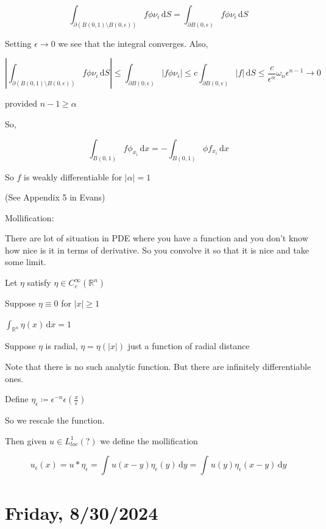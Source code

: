 \documentclass{article}
\theoremstyle{definition}
\begin{document}
\[
    \int_{\partial (B(0,1)\setminus B(0,\epsilon ))}^{} f \phi \nu _i \,\mathrm{d}S = \int_{\partial B(0,\epsilon)}^{} f \phi \nu_i \,\mathrm{d}S
\]

Setting \(\epsilon \to 0\) we see that the integral converges. Also,

\[
    \left\vert \int_{\partial (B(0,1)\setminus B(0,\epsilon))}^{} f \phi \nu_i \,\mathrm{d}S  \right\vert \leq \int_{\partial B(0,\epsilon)}^{} \vert f \phi \nu_i \vert \leq c \int_{\partial B(0,\epsilon)}^{} \vert f \vert  \,\mathrm{d}S \leq \frac{c}{\epsilon^\alpha} \omega_n \epsilon^{n-1} \to 0
\]

provided \(n - 1 \geq \alpha\) 

So,

\[
    \int_{B(0,1)}^{} f \phi_{x_i} \,\mathrm{d}x = - \int_{B(0,1)}^{} \phi f_{x_i} \,\mathrm{d}x 
\]

So \(f\) is weakly differentiable for \(\vert \alpha  \vert = 1\) 

(See Appendix 5 in Evans)

Mollification:

There are lot of situation in PDE where you have a function and you don't know how nice is it in terms of derivative. So you convolve it so that it is nice and take some limit.

Let \(\eta\) satisfy \(\eta \in C_c^{\infty} (\mathbb{R}^n)\)

Suppose \(\eta \equiv 0\) for \(\vert x \vert \geq 1\) 

\(\int_{\mathbb{R} ^n}^{} \eta (x) \,\mathrm{d}x = 1\) 

Suppose \(\eta \) is radial, \(\eta = \eta (\vert x \vert)\) just a function of radial distance

Note that there is no such analytic function. But there are infinitely differentiable ones.

Define \(\eta_{\epsilon} \coloneqq \epsilon^{- n} \epsilon(\frac{x}{\epsilon})\) 

So we rescale the function.

Then given \(u \in L^1_{loc}(?)\) we define the mollification

\[
    u_{\epsilon}(x) = u \ast \eta _\epsilon = \int_{}^{} u(x-y) \eta_{\epsilon } (y) \,\mathrm{d}y = \int_{}^{} u(y) \eta _\epsilon (x-y) \,\mathrm{d}y 
\]


\section*{Friday, 8/30/2024}
\end{document}
